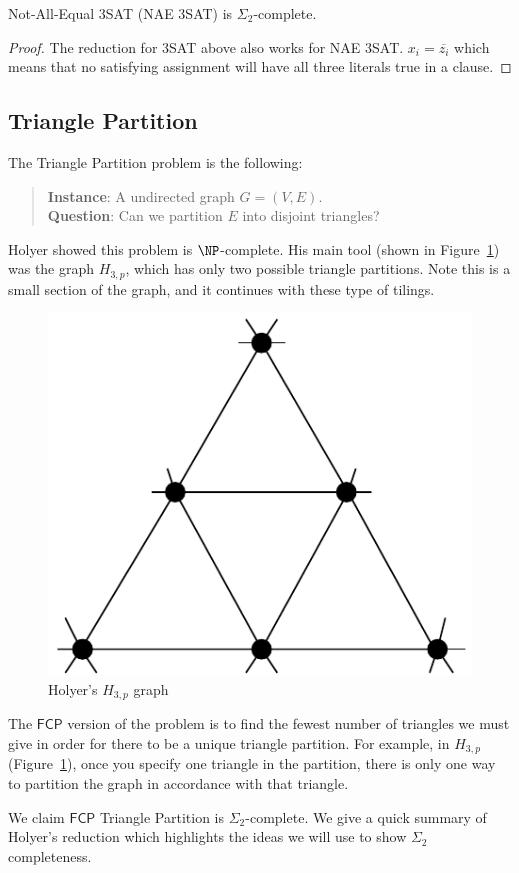 \documentclass[runningheads,a4paper]{llncs}
\begin{document}
\begin{corollary}
Not-All-Equal 3SAT (NAE 3SAT) is $\Sigma_2$-complete.
\end{corollary}

\begin{proof}
The reduction for 3SAT above also works for NAE 3SAT. $x_i = \overline{z_i}$ which means that no satisfying assignment will have all three literals true in a clause. 
\end{proof}

\subsection{Triangle Partition}\label{S:TP}

The Triangle Partition problem is the following:
\begin{quote}
\textbf{Instance}: A undirected graph $G = (V, E)$.\\
\textbf{Question}: Can we partition $E$ into disjoint triangles?
\end{quote}

Holyer \cite{holyer1981np} showed this problem is $\NP$-complete. His main tool (shown in Figure~\ref{fig:holyergraph}) was the graph $H_{3, p}$, which has only two possible triangle partitions. Note this is a small section of the graph, and it continues with these type of tilings.
\begin{figure}
\label{fig:holyergraph}
\centering
\includegraphics[width=0.4\linewidth]{Holyergraph.pdf}
\caption{Holyer's $H_{3,p}$ graph}
\end{figure}

The $\mathsf{FCP}$ version of the problem is to find the fewest number of triangles we must give in order for there to be a unique triangle partition. For example, in $H_{3,p}$ (Figure~\ref{fig:holyergraph}), once you specify one triangle in the partition, there is only one way to partition the graph in accordance with that triangle.

We claim $\mathsf{FCP}$ Triangle Partition is $\Sigma_2$-complete. We give a quick summary of Holyer's reduction which highlights the ideas we will use to show $\Sigma_2$ completeness. 
\end{document}
